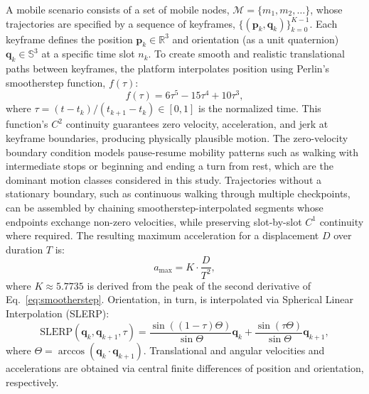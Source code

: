\documentclass[fleqn,10pt]{wlscirep}
\newcommand{\rev}[1]{{\color{revblue}#1}}
\begin{document}
A mobile scenario consists of a set of mobile nodes, $\mathcal{M} = \{m_1, m_2, \dots\}$, whose trajectories are specified by a sequence of keyframes, $\{(\mathbf{p}_k, \mathbf{q}_k)\}_{k=0}^{K-1}$. Each keyframe defines the position $\mathbf{p}_k \in \mathbb{R}^3$ and orientation (as a unit quaternion) $\mathbf{q}_k \in \mathbb{S}^3$ at a specific time slot $n_k$. To create smooth and realistic translational paths between keyframes, the platform interpolates position using Perlin's smootherstep function\cite{Perlin2002}, $f(\tau)$:
\begin{equation}
f(\tau) = 6\tau^5 - 15\tau^4 + 10\tau^3,
\label{eq:smootherstep}
\end{equation}
where $\tau = (t - t_k) / (t_{k+1} - t_k) \in [0, 1]$ is the normalized time. This function's $C^2$ continuity guarantees zero velocity, acceleration, and jerk at keyframe boundaries, producing physically plausible motion. \rev{The zero-velocity boundary condition models pause-resume mobility patterns such as walking with intermediate stops or beginning and ending a turn from rest, which are the dominant motion classes considered in this study. Trajectories without a stationary boundary, such as continuous walking through multiple checkpoints, can be assembled by chaining smootherstep-interpolated segments whose endpoints exchange non-zero velocities, while preserving slot-by-slot $C^1$ continuity where required.} The resulting maximum acceleration for a displacement $D$ over duration $T$ is:
\begin{equation}
    a_{\max} = K \cdot \frac{D}{T^2},
\end{equation}
where $K \approx 5.7735$ is derived from the peak of the second derivative of Eq.~\eqref{eq:smootherstep}. Orientation, in turn, is interpolated via Spherical Linear Interpolation (SLERP):
\begin{equation}
    \text{SLERP}(\mathbf{q}_k, \mathbf{q}_{k+1}, \tau) = \frac{\sin((1-\tau)\Theta)}{\sin\Theta}\mathbf{q}_k + \frac{\sin(\tau\Theta)}{\sin\Theta}\mathbf{q}_{k+1},
\end{equation}
where $\Theta = \arccos(\mathbf{q}_k \cdot \mathbf{q}_{k+1})$. Translational and angular velocities and accelerations are obtained via central finite differences of position and orientation, respectively.
\end{document}
